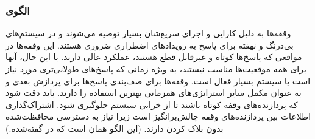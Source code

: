 \subsubsection{الگوی }
\label{archConInterruptSec}
\begin{RTL}
وقفه‌ها به دلیل کارایی و اجرای سریع‌شان بسیار توصیه می‌شوند و در سیستم‌های بی‌درنگ
و نهفته برای پاسخ به رویدادهای اضطراری ضروری هستند.
این وقفه‌ها در مواقعی که پاسخ‌ها کوتاه و غیرقابل قطع هستند، عملکرد عالی دارند.
با این حال، آنها برای همه موقعیت‌ها مناسب نیستند، به ویژه زمانی که پاسخ‌های طولانی‌تری
مورد نیاز است یا سیستم بسیار فعال است. وقفه‌ها برای صف‌بندی پاسخ‌ها
برای پردازش بعدی و به عنوان مکمل سایر استراتژی‌های همزمانی بهترین استفاده
را دارند. باید دقت شود که پردازنده‌های وقفه کوتاه باشند تا از خرابی سیستم
جلوگیری شود. اشتراک‌گذاری اطلاعات بین پردازنده‌های وقفه چالش‌برانگیز
است زیرا نیاز به دسترسی محافظت‌شده بدون بلاک کردن دارند.
(این الگو همان  است که
در \cite{ref1} گفته‌شده.)
\end{RTL}